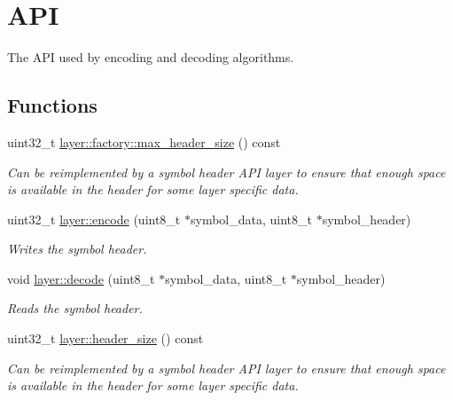 \hypertarget{group__codec__header__api}{\section{A\-P\-I}
\label{group__codec__header__api}
}


The A\-P\-I used by encoding and decoding algorithms.  


\subsection*{Functions}
\begin{DoxyCompactItemize}
\item 
uint32\-\_\-t \hyperlink{group__codec__header__api_ga7138ea5d64116c9594774e0a3806eece}{layer\-::factory\-::max\-\_\-header\-\_\-size} () const 
\begin{DoxyCompactList}\small\item\em Can be reimplemented by a symbol header A\-P\-I layer to ensure that enough space is available in the header for some layer specific data. \end{DoxyCompactList}\item 
uint32\-\_\-t \hyperlink{group__codec__header__api_ga3ea9da4a5ac2dcdc55fc29b5ebdfbd84}{layer\-::encode} (uint8\-\_\-t $\ast$symbol\-\_\-data, uint8\-\_\-t $\ast$symbol\-\_\-header)
\begin{DoxyCompactList}\small\item\em Writes the symbol header. \end{DoxyCompactList}\item 
void \hyperlink{group__codec__header__api_gab3d95c09e12d501a3f94216643144c74}{layer\-::decode} (uint8\-\_\-t $\ast$symbol\-\_\-data, uint8\-\_\-t $\ast$symbol\-\_\-header)
\begin{DoxyCompactList}\small\item\em Reads the symbol header. \end{DoxyCompactList}\item 
uint32\-\_\-t \hyperlink{group__codec__header__api_gaee83194d70603b13eeaa786ca6e9cdeb}{layer\-::header\-\_\-size} () const 
\begin{DoxyCompactList}\small\item\em Can be reimplemented by a symbol header A\-P\-I layer to ensure that enough space is available in the header for some layer specific data. \end{DoxyCompactList}\end{DoxyCompactItemize}


